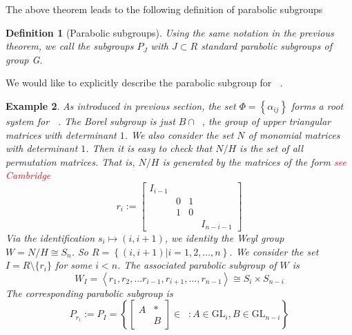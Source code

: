 \documentclass[12pt]{article} %
\newtheorem{definition}{Definition}[section]
\newtheorem{example}[definition]{Example}
\DeclareMathOperator{\SLn}{\text{SL}_n(\mathbb{R})}
\begin{document}
The above theorem leads to the following definition of parabolic subgroups
\begin{definition}[Parabolic subgroups]
    Using the same notation in the previous theorem, we call the subgroups $P_J$ with $J \subset R$  \textit{standard parabolic subgroups} of group G.
\end{definition}
We would like to explicitly describe the parabolic subgroup for $\SLn$.
\begin{example}
    As introduced in previous section, the set $\Phi = \left\lbrace \alpha_{ij}\right\rbrace $ forms a
    root system for $\SLn$. The Borel subgroup is just $B \cap \SLn$, the group of upper triangular matrices with determinant $1$.
    We also consider the set $N$ of monomial matrices  with determinant $1$. Then it is easy to check that
    $N/H$ is the set of all permutation matrices. That is, $N/H$ is generated by the
    matrices of the form \textcolor{red}{see Cambridge}
    \[r_i := \begin{bmatrix}
            I_{i-1} &   &    &           \\
                    & 0 & 1 &           \\
                    & 1 & 0  &           \\
                    &   &    & I_{n-i-1}
        \end{bmatrix}\]
    Via the identification $s_i \mapsto (i,i+1)$, we identity the Weyl group $W = N/H \cong S_n$. So 
    $R = \left\lbrace (i,i+1)| i = 1,2,\ldots,n\right\rbrace $. We consider the set 
    $I = R \setminus \{r_i\}$ for some $i<n$. The associated parabolic subgroup of 
    $W$ is 
    \[W_I = \left\langle r_1,r_2,\ldots r_{i-1},r_{i+1},\ldots, r_{n-1} \right\rangle \cong 
    S_i \times S_{n-i}\]
    The corresponding parabolic subgroup is 
    \[P_{r_i} := P_I = \left\lbrace \begin{bmatrix}
        A & \ast \\
        & B
    \end{bmatrix} \in \SLn: A \in \text{GL}_i, B \in \text{GL}_{n-i}\right\rbrace \]
\end{example}
\end{document}
